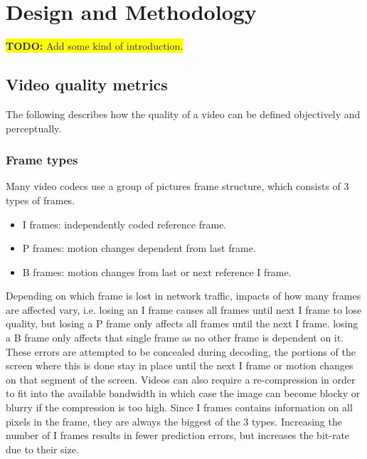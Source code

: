 \chapter{Design and Methodology}
\label{cha:design-and-method}

\colorbox{yellow}{\textbf{TODO:} Add some kind of introduction.}


\section{Video quality metrics}
The following describes how the quality of a video can be defined objectively and perceptually.

\subsection{Frame types}
Many video codecs use a group of pictures frame structure, which consists of 3 types of frames.

\begin{itemize}
    \item I frames: independently coded reference frame.
    \item P frames: motion changes dependent from last frame.
    \item B frames: motion changes from last or next reference I frame.
\end{itemize}

Depending on which frame is lost in network traffic, impacts of how many frames are affected vary, i.e. losing an I frame causes all frames until next I frame to lose quality, but losing a P frame only affects all frames until the next I frame. losing a B frame only affects that single frame as no other frame is dependent on it.\\
These errors are attempted to be concealed during decoding, the portions of the screen where this is done stay in place until the next I frame or motion changes on that segment of the screen. Videos can also require a re-compression in order to fit into the available bandwidth in which case the image can become blocky or blurry if the compression is too high.
Since I frames contains information on all pixels in the frame, they are always the biggest of the 3 types. Increasing the number of I frames results in fewer prediction errors, but increases the bit-rate due to their size.


